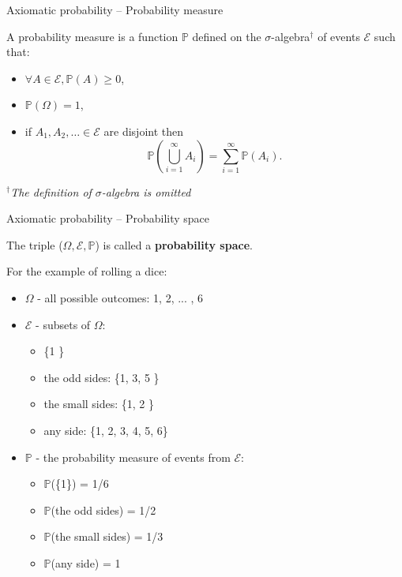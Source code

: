 \documentclass{beamer}
\begin{document}

\begin{frame}
{\centerline{Axiomatic probability -- Probability measure}}
A probability measure is a function $\mathbb{P}$ defined on the $\sigma$-algebra$^\dag$ of events $\mathcal{E}$ such that:
\begin{itemize}
\item $\forall A \in \mathcal{E}, \mathbb{P}(A) \geq 0$,
\item $\mathbb{P}(\Omega) = 1 $,
\item if $ A_1, A_2, \ldots \in \mathcal{E}$ are disjoint then 
$$\mathbb{P}\left( \bigcup_{i=1}^{\infty}A_i \right) = \sum_{i=1}^{\infty} \mathbb{P}(A_i).$$
\end{itemize}

\vspace*{1cm}
$^\dag$\textit{\small The definition of $\sigma$-algebra is omitted}

\end{frame}


\begin{frame}
{\centerline{Axiomatic probability -- Probability space}}
The triple ($\Omega, \mathcal{E}, \mathbb{P}$) is called a \textbf{probability space}. 
\newline

For the example of rolling a dice:
\begin{itemize}
\item $\Omega$ - all possible outcomes: 1, 2, ... , 6
\item $\mathcal{E}$ - subsets of $\Omega$: 
\begin{itemize}
\item  \{1 \}
\item the odd sides:  \{1, 3, 5 \}
\item the small sides:  \{1, 2 \}
\item any side: \{1, 2, 3, 4, 5, 6\}
\end{itemize}
\item $\mathbb{P}$ - the probability measure of events from $\mathcal{E}$:
\begin{itemize}
\item $\mathbb{P}$(\{1\}) = 1/6
\item $\mathbb{P}$(the odd sides) = 1/2
\item $\mathbb{P}$(the small sides) = 1/3
\item $\mathbb{P}$(any side) = 1
\end{itemize}
\end{itemize}

\end{frame}
\end{document}
